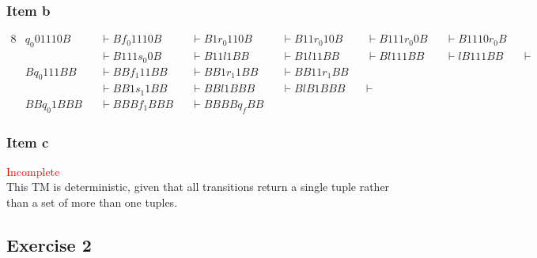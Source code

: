 \documentclass[docid=TP11]{tcom_TP}
\begin{document}
{\begin{center}
\end{center}
\subsubsection{Item b}
\begin{alignat*}{8}
	& q_0 01110B  &&\vdash B f_0 1110B &&\vdash B1 r_0 110B &&\vdash B11 r_0 10B &&\vdash B111 r_0 0B &&\vdash B1110 r_0 B &&\\
	&             &&\vdash B111 s_0 0B &&\vdash B11 l 1BB   &&\vdash B1 l 11BB   &&\vdash B l 111BB   &&\vdash l B111BB    &&\vdash \\
	& B q_0 111BB &&\vdash BB f_1 11BB &&\vdash BB1 r_1 1BB &&\vdash BB11 r_1 BB \\
	&			  &&\vdash BB1 s_1 1BB &&\vdash BB l 1BBB   &&\vdash B l B1BBB   &&\vdash\\
	& BB q_0 1BBB &&\vdash BBB f_1 BBB &&\vdash BBBB q_f BB 
\end{alignat*}
\subsubsection{Item c}
\textcolor{red}{Incomplete}\\
This TM is deterministic, given that all transitions return a single tuple rather than a set of more than one tuples.
\subsection{Exercise 2}
}
\end{document}
